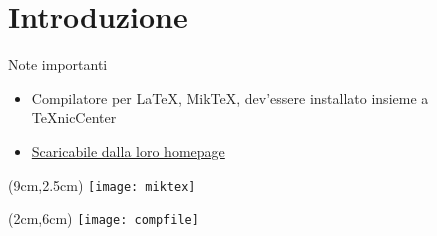 \section{Introduzione}
  \begin{frame}{Note importanti}

    \begin{itemize}
      \item Compilatore per \LaTeX, MikTeX, dev'essere 
installato insieme a TeXnicCenter
      \item \href{https://miktex.org/download}{Scaricabile dalla loro homepage}
    \end{itemize}
    
    \begin{textblock*}{5cm}(9cm,2.5cm)
      \texttt{[image: miktex]}
    \end{textblock*}

    \begin{textblock*}{5cm}(2cm,6cm)
      \texttt{[image: compfile]}
    \end{textblock*}

  \end{frame}